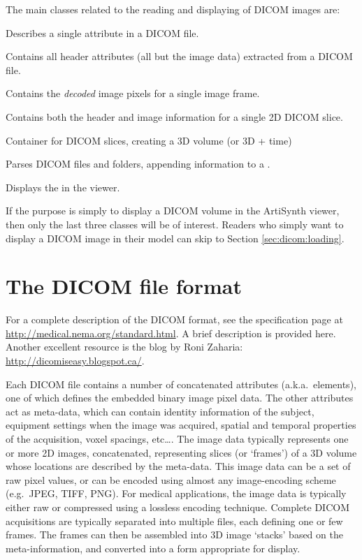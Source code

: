The main classes related to the reading and displaying of DICOM images are:
\begin{lstdescription}
   \item[{\protect \javaclass[maspack.image.dicom]{DicomElement}}] Describes a single attribute in a DICOM file.
   \item[{\protect \javaclass[maspack.image.dicom]{DicomHeader}}] Contains all header attributes (all but the image data) extracted from a DICOM file.
   \item[{\protect \javaclass[maspack.image.dicom]{DicomPixelBuffer}}] Contains the \emph{decoded} image pixels for a single image frame.
   \item[{\protect \javaclass[maspack.image.dicom]{DicomSlice}}] Contains both the header and image information for a single 2D DICOM slice.
   \item[{\protect \javaclass[maspack.image.dicom]{DicomImage}}] Container for DICOM slices, creating a 3D volume (or 3D + time)
   \item[{\protect \javaclass[maspack.image.dicom]{DicomReader}}] Parses DICOM files and folders, appending information to a . 
   \item[{\protect \javaclass[artisynth.core.renderables]{DicomViewer}}] Displays the  in the viewer.
\end{lstdescription}
If the purpose is simply to display a DICOM volume in the ArtiSynth viewer, then only the last three classes will be of interest.  Readers who simply want to display a DICOM image in their model can skip to Section \ref{sec:dicom:loading}.

\section{The DICOM file format}

For a complete description of the DICOM format, see the specification page at \url{http://medical.nema.org/standard.html}.  A brief
description is provided here.  Another excellent resource is the blog by Roni Zaharia: \url{http://dicomiseasy.blogspot.ca/}.

Each DICOM file contains a number of concatenated attributes (a.k.a.~elements), one of which defines the embedded binary image pixel data.  The other attributes act as meta-data, which can contain identity information of the subject, equipment settings when the image was acquired, spatial and temporal properties of the acquisition, voxel spacings, etc\ldots.  The image data typically represents one or more 2D images, concatenated, representing slices (or `frames') of a 3D volume whose locations are described by the meta-data.  This image data can be a set of raw pixel values, or can be encoded using almost any image-encoding scheme (e.g.~JPEG, TIFF, PNG).  For medical applications, the image data is typically either raw or compressed using a lossless encoding technique.  Complete DICOM acquisitions are typically separated into multiple files, each defining one or few frames.  The frames can then be assembled into 3D image `stacks' based on the meta-information, and converted into a form appropriate for display.

